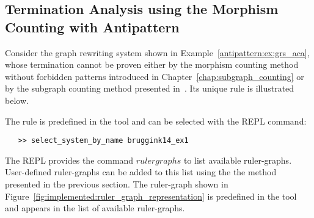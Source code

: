 \subsection{Termination Analysis using the Morphism Counting with Antipattern}
Consider the graph rewriting system shown in Example~\ref{antipattern:ex:grs_aca}, whose termination cannot be proven either by the morphism counting method without forbidden patterns introduced in Chapter~\ref{chap:subgraph_counting} or by the subgraph counting method presented in~\cite{overbeek2024termination_lmcs}. Its unique rule is illustrated below.
\begin{center}
\end{center}
The rule is predefined in the tool and can be selected with the REPL command:
 \begin{verbatim}
   >> select_system_by_name bruggink14_ex1
 \end{verbatim}
The REPL provides the command \colorbox{Ivory2}{$rulergraphs$} to list available ruler-graphs. User-defined ruler-graphs can be added to this list using the the method presented in the previous section. The ruler-graph shown in Figure~\ref{fig:implemented:ruler_graph_representation} is predefined in the tool and appears in the list of available ruler-graphs.

